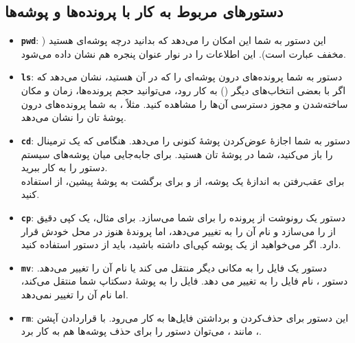\subsection{دستورهای مربوط به کار با پرونده‌ها و پوشه‌ها}
\begin{itemize}
\item \textbf{\texttt{\Large pwd}}: این دستور به شما این امکان را می‌دهد که بدانید درچه پوشه‌ای هستید ( مخفف عبارت  است).  این اطلاعات را در نوار عنوان پنجره هم نشان داده می‌شود.

\item \textbf{\texttt{\Large ls}}: دستور  به شما پرونده‌های درون پوشه‌ای را که در آن هستید، نشان می‌دهد که اگر با بعضی انتخاب‌های دیگر () به کار رود، می‌توانید حجم پرونده‌ها، زمان و مکان ساخته‌شدن و مجوز دسترسی آن‌ها را مشاهده کنید. مثلاً ، به شما پرونده‌های درون پوشهٔ تان را نشان می‌دهد.

\item \textbf{\texttt{\Large cd}}: دستور  به شما اجازهٔ عوض‌کردن پوشهٔ کنونی را می‌دهد. هنگامی که یک ترمینال را باز می‌کنید، شما در پوشهٔ تان هستید. برای جابه‌جایی میان پوشه‌های سیستم دستور  را به کار ببرید.\\
برای عقب‌رفتن به اندازهٔ یک پوشه، از  و برای برگشت به پوشهٔ پیشین، از  استفاده کنید.

\item \textbf{\texttt{\Large cp}}: دستور  یک رونوشت از پرونده را برای شما می‌سازد. برای مثال،  یک کپی دقیق از  را می‌سازد و نام آن را به  تغییر می‌دهد، اما پروندهٔ  هنوز در محل خودش قرار دارد. اگر می‌خواهید از یک پوشه کپی‌ای داشته باشید، باید از دستور  استفاده کنید.

\item \textbf{\texttt{\Large mv}}: دستور  یک فایل را به مکانی دیگر منتقل می کند یا نام آن را تغییر می‌دهد. دستور ، نام فایل  را به  تغییر می دهد.  فایل  را به پوشهٔ دسکتاپ شما منتقل می‌کند، اما نام آن را تغییر نمی‌دهد.


\item \textbf{\texttt{\Large rm}}: این دستور برای حذف‌کردن و برداشتن فایل‌ها به کار می‌رود. با قراردادن آپشن ، مانند ، می‌توان دستور را برای حذف پوشه‌ها هم به کار برد.


\end{itemize}
